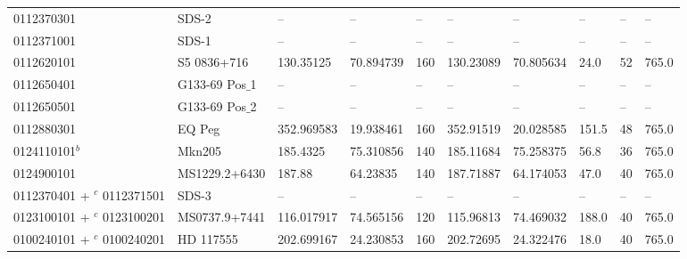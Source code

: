 \documentclass[fleqn,usenatbib]{mnras}
\begin{document}
\begin{table*}
\begin{tabular}{llllllllll}
         0112370301 &           SDS-2 &          -- &          -- &                  -- &         -- &          -- &           -- &                  -- &                  -- \\
         0112371001 &           SDS-1 &          -- &          -- &                  -- &         -- &          -- &           -- &                  -- &                  -- \\
         0112620101 &     S5 0836+716 &   130.35125 &   70.894739 &                 160 &  130.23089 &   70.805634 &         24.0 &                  52 &               765.0 \\
         0112650401 &   G133-69 Pos$\_$1 &       -- &          -- &                  -- &         -- &          -- &           -- &                  -- &                  -- \\
         0112650501 &   G133-69 Pos$\_$2 &       -- &          -- &                  -- &         -- &          -- &           -- &                  -- &                  -- \\
         0112880301 &          EQ Peg &  352.969583 &   19.938461 &                 160 &  352.91519 &   20.028585 &        151.5 &                  48 &               765.0 \\
         0124110101$^b$ &          Mkn205 &    185.4325 &   75.310856 &                 140 &  185.11684 &   75.258375 &         56.8 &                  36 &               765.0 \\
         0124900101 &   MS1229.2+6430 &      187.88 &    64.23835 &                 140 &  187.71887 &   64.174053 &         47.0 &                  40 &               765.0 \\
         \parbox{2cm}{\vspace{1.5mm} 0112370401 + $^c$ \\ 0112371501 \vspace{1.5mm}} &           SDS-3 &          -- &          -- &                  -- &         -- &          -- &           -- &                  -- &                  -- \\
         \parbox{2cm}{\vspace{1.5mm} 0123100101 + $^c$ \\ 0123100201 \vspace{1.5mm}} &   MS0737.9+7441 &  116.017917 &   74.565156 &                 120 &  115.96813 &   74.469032 &        188.0 &                  40 &               765.0 \\
         \parbox{2cm}{\vspace{1.5mm} 0100240101 + $^c$ \\ 0100240201 \vspace{1.5mm}} &       HD 117555 &  202.699167 &   24.230853 &                 160 &  202.72695 &   24.322476 &         18.0 &                  40 &               765.0 \\

\end{tabular}
\end{table*}
\end{document}
